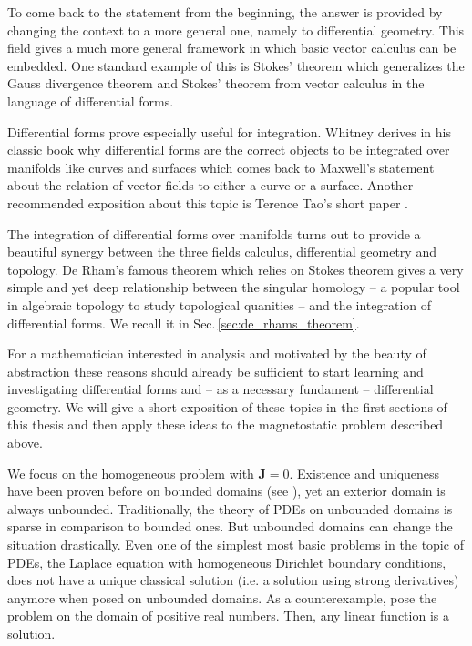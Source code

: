\documentclass[../master_thesis.tex]{subfiles}
\begin{document}
To come back to the statement from the beginning, the answer is provided 
by changing the context to a more general one, namely to differential geometry. 
This field
gives a much more general framework in which basic vector calculus can 
be embedded. One standard example of this is Stokes' theorem 
which generalizes the Gauss divergence theorem and Stokes' theorem from vector calculus 
in the language of differential forms.

Differential forms prove especially useful for integration. 
Whitney derives in his classic book \cite{whitney} why differential forms are
the correct objects to be integrated over manifolds like curves and surfaces which comes back 
to Maxwell's statement about the relation 
of vector fields to either a curve or a surface. 
Another recommended exposition about this topic is Terence Tao's short paper \cite{terence_tao}. 

The integration of differential forms over manifolds turns out to provide 
a beautiful synergy between the three fields 
calculus, differential geometry and topology. De Rham's famous theorem which 
relies on Stokes theorem 
gives a very simple and yet deep relationship between the singular homology -- 
a popular tool in algebraic topology to study topological quanities -- 
and the integration of differential forms. We recall it in Sec.\,\ref{sec:de_rhams_theorem}.

For a mathematician interested in analysis and motivated by the beauty of abstraction 
these reasons should already be sufficient to start learning and investigating 
differential forms and -- as a necessary fundament -- differential geometry. We will 
give a short exposition of these topics in the first sections of this thesis 
and then apply these ideas to the magnetostatic problem described above.

We focus on the homogeneous problem with $\mathbf{J} = 0$.
Existence and uniqueness have been proven before on bounded domains 
(see \cite[Thm.\,5.4]{mitrea_layer_potentials}),
yet an exterior domain is always unbounded. 
Traditionally, the theory of PDEs on unbounded domains 
is sparse in comparison to bounded ones. But unbounded domains can change the 
situation drastically. Even one of the simplest most basic problems in the topic 
of PDEs, the Laplace equation with homogeneous Dirichlet boundary conditions, does not 
have a unique classical solution (i.e. a solution using strong derivatives) 
anymore when posed on unbounded domains. As a counterexample,
pose the problem on the domain of positive real numbers. Then, any linear function 
is a solution.
\end{document}
